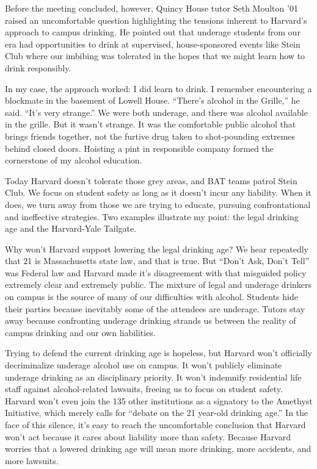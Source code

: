 Before the meeting concluded, however, Quincy House tutor Seth Moulton '01
raised an uncomfortable question highlighting the tensions inherent to
Harvard's approach to campus drinking. He pointed out that underage students
from our era had opportunities to drink at supervised, house-sponsored events
like Stein Club where our imbibing was tolerated in the hopes that we might
learn how to drink responsibly.

In my case, the approach worked: I did learn to drink. I remember
encountering a blockmate in the basement of Lowell House. ``There's alcohol
in the Grille,'' he said. ``It's very strange.'' We were both underage, and
there was alcohol available in the grille. But it wasn't strange. It was the
comfortable public alcohol that brings friends together, not the furtive drug
taken to shot-pounding extremes behind closed doors. Hoisting a pint in
responsible company formed the cornerstone of my alcohol education.

Today Harvard doesn't tolerate those grey areas, and BAT teams patrol Stein
Club. We focus on student safety as long as it doesn't incur any liability.
When it does, we turn away from those we are trying to educate, pursuing
confrontational and ineffective strategies. Two examples illustrate my point:
the legal drinking age and the Harvard-Yale Tailgate.

Why won't Harvard support lowering the legal drinking age? We hear repeatedly
that 21 is Massachusetts state law, and that is true. But ``Don't Ask, Don't
Tell'' was Federal law and Harvard made it's disagreement with that misguided
policy extremely clear and extremely public. The mixture of legal and
underage drinkers on campus is the source of many of our difficulties with
alcohol. Students hide their parties because inevitably some of the attendees
are underage. Tutors stay away because confronting underage drinking strands
us between the reality of campus drinking and our own liabilities.

Trying to defend the current drinking age is hopeless, but Harvard won't
officially decriminalize underage alcohol use on campus. It won't publicly
eliminate underage drinking as an disciplinary priority. It won't indemnify
residential life staff against alcohol-related lawsuits, freeing us to focus
on student safety. Harvard won't even join the 135 other institutions as a
signatory to the Amethyst Initiative, which merely calls for ``debate on the
21 year-old drinking age.'' In the face of this silence, it's easy to reach
the uncomfortable conclusion that Harvard won't act because it cares about
liability more than safety. Because Harvard worries that a lowered drinking
age will mean more drinking, more accidents, and more lawsuits.

